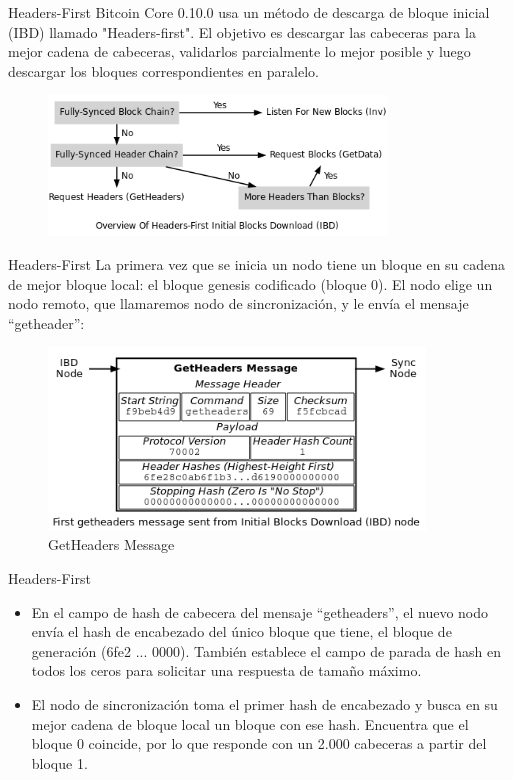 \documentclass[compress,brown,xcolor=table]{beamer}
\begin{document}
\begin{frame}{Headers-First}
Bitcoin Core 0.10.0 usa un método de descarga de bloque inicial (IBD) llamado "Headers-first". El objetivo es descargar las cabeceras para la mejor cadena de cabeceras, validarlos parcialmente lo mejor posible y luego descargar los bloques correspondientes en paralelo.\\

\begin{figure}[h]
	\includegraphics[width=9cm]{../images/Image1.png}
	\centering		
\end{figure}

\end{frame}

\begin{frame}{Headers-First}
La primera vez que se inicia un nodo tiene un bloque en su cadena de mejor bloque local: el bloque genesis codificado (bloque 0). El nodo elige un nodo remoto, que llamaremos nodo de sincronización, y le envía el mensaje ``getheader'':\\

\begin{figure}[h]
	\includegraphics[width=10cm]{../images/Image2.png}
	\centering		
	\caption{GetHeaders Message}
	\label{p5}
\end{figure}
\end{frame}

\begin{frame}{Headers-First}
\begin{itemize}
	\item En el campo de hash de cabecera del mensaje ``getheaders'', el nuevo nodo envía el hash de encabezado del único bloque que tiene, el bloque de generación (6fe2 ... 0000). También establece el campo de parada de hash en todos los ceros para solicitar una respuesta de tamaño máximo.\\

	\item El nodo de sincronización toma el primer hash de encabezado y busca en su mejor cadena de bloque local un bloque con ese hash. Encuentra que el bloque 0 coincide, por lo que responde con un 2.000 cabeceras a partir del bloque 1.
\end{itemize}
\end{frame}
\end{document}
